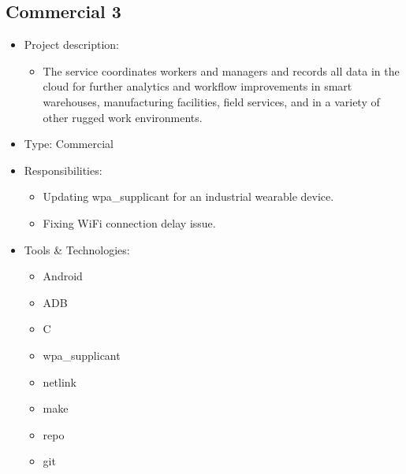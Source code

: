 \hypertarget{proj_com3}{\subsection{Commercial 3}}
\begin{itemize}
    \item Project description:
    \begin{itemize}
        \item The service coordinates workers and managers and records all data in the
              cloud for further analytics and workflow improvements in smart warehouses,
              manufacturing facilities, field services, and in a variety of other rugged work
              environments.
    \end{itemize}
    \item Type: Commercial
    \item Responsibilities:
    \begin{itemize}
        \item Updating wpa\_supplicant for an industrial wearable device.
        \item Fixing WiFi connection delay issue.
    \end{itemize}
    \item Tools \& Technologies:
    \begin{itemize}
        \item Android
        \item ADB
        \item C
        \item wpa\_supplicant
        \item netlink
        \item make
        \item repo
        \item git
    \end{itemize}
\end{itemize}
\newpage


